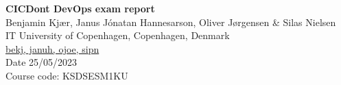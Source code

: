 \newcommand{\titleOfPaper}{CICDont DevOps exam report}
\newcommand{\authorOfPaper}{Benjamin Kjær, Janus Jónatan Hannesarson, Oliver Jørgensen \& Silas Nielsen }
\newcommand{\authoremail}{bekj, januh, ojoe, sipn}
\newcommand{\coursecode}{KSDSESM1KU}
\newcommand{\handInDate}{25/05/2023}

\begin{center}
    \textbf{\huge \titleOfPaper} \\ \vspace{1em}
    \authorOfPaper \\ \vspace{1em}
    IT University of Copenhagen, Copenhagen, Denmark \\
    \href{mailto:\authoremail}{\authoremail} \\ \vspace{1em}
    Date \handInDate \\ \vspace{1em}
    Course code: \coursecode
\end{center} 